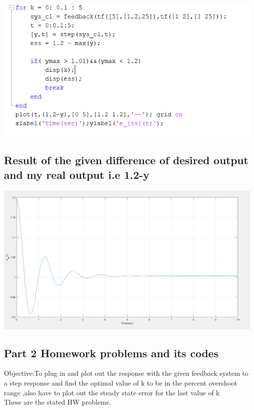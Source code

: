 \documentclass[12pt]{article}
\begin{document}
\includegraphics[scale=0.4]{../Lab8/Pictures/LabProblem1Code1.png} \\ 

\subsection{Result of the given difference of desired output and my real output i.e 1.2-y} 

\includegraphics[scale=0.4]{../Lab8/Pictures/LabProblem1Result1.png}  \\ 


\cleardoublepage



 
\cleardoublepage
\subsection{Part 2 Homework problems and its codes}
Objective:To plug in and plot out the response with the given feedback system to a step response and find the optimal value of k to be in the percent overshoot range ,also have to plot out the steady state error for the last value of k\\
These are the stated HW problems.
\end{document}
